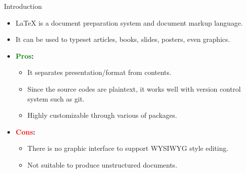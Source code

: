 \begin{frame}{Introduction}
  \begin{itemize}
    \item \alert{\LaTeX{}} is a document preparation system and document markup language.
    \item It can be used to typeset articles, books, slides, posters, even graphics.
    \item \textbf{\textcolor{Green}{Pros}:}
          \begin{itemize}
            \item It separates presentation/format from contents.
            \item Since the source codes are plaintext, it works well with version control system such as git.
            \item Highly customizable through various of packages.
          \end{itemize}
    \item \textbf{\textcolor{Red}{Cons}:}
          \begin{itemize}
            \item There is no graphic interface to support WYSIWYG style editing.
            \item Not suitable to produce unstructured documents.
          \end{itemize}
  \end{itemize}
\end{frame}


